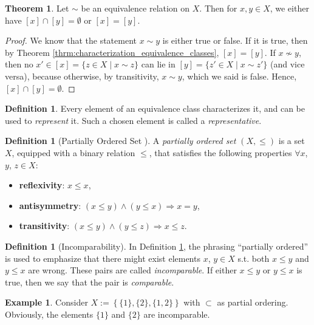 \documentclass[12pt, a4paper]{article}
\numberwithin{equation}{section}
\theoremstyle{definition}
\theoremstyle{definition}
\newtheorem{defn}[thm]{Definition} %
\newtheorem{exmp}[thm]{Example} %
\newtheorem{theorem}[thm]{Theorem}
\begin{document}
	\begin{theorem}
		Let $\sim$ be an equivalence relation on $X$. Then for $x, y\in X$, we either have $[x] \cap [y] = \emptyset$ or $[x] = [y]$.
	\end{theorem}

	\begin{proof}
		We know that the statement $x\sim y$ is either true or false. If it is true, then by Theorem \ref{thrm:characterization_equivalence_classes}, $[x] = [y]$. If $x\not\sim y$, then no $x'\in [x] = \{z\in X\mid x\sim z\}$ can lie in $[y] = \{z'\in X\mid x\sim z'\}$ (and vice versa), because otherwise, by transitivity, $x\sim y$, which we said is false. Hence, $[x] \cap [y] = \emptyset$.
	\end{proof}

	\begin{defn}
		Every element of an equivalence class characterizes it, and can be used to \textit{represent} it. Such a chosen element is called a \textit{representative}.
	\end{defn}

	\begin{defn}[Partially Ordered Set \cite{kuratowski_zorn_lemma}]\label{partially_ordered_set}
		A \textit{partially ordered set}  $\left(X, \leq\right)$ is a set $X$, equipped with a binary relation $\leq$, that satisfies the following properties $\forall x$, $y$, $z\in X$:
		\begin{itemize}
			\item \textbf{reflexivity}: $x\leq x$, 
			\item \textbf{antisymmetry}: $\left(x\leq y\right) \wedge \left(y\leq x\right) \Rightarrow x = y$, 
			\item \textbf{transitivity}: $\left(x\leq y\right) \wedge \left(y\leq z\right)\Rightarrow x\leq z$. 
		\end{itemize}
	\end{defn}

	\begin{defn}[Incomparability]
		In Definition \ref{partially_ordered_set}, the phrasing \enquote{partially ordered} is used to emphasize that there might exist elements $x$, $y\in X$ s.t. both $x\leq y$ and $y\leq x$ are wrong. These pairs are called \textit{incomparable}. If either $x\leq y$ or $y \leq x$ is true, then we say that the pair is \textit{comparable}. 
	\end{defn}
	
	\begin{exmp}
		Consider $X := \left\{\{1\}, \{2\}, \{1, 2\}\right\}$ with $\subset$ as partial ordering. Obviously, the elements $\{1\}$ and $\{2\}$ are incomparable. 
	\end{exmp}
\end{document}
